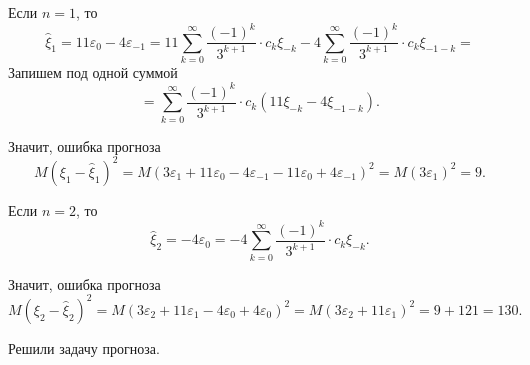 \begin{enumerate}[label=\alph*)]
  Если $n = 1$, то
  \begin{equation*}
    \hat{ \xi }_1 =
    11 \varepsilon_0 - 4 \varepsilon_{-1} =
    11 \sum \limits_{k = 0}^{ \infty } \frac{ \left( -1 \right)^k}{3^{k + 1}} \cdot c_k \xi_{-k} -
    4 \sum \limits_{k = 0}^{ \infty }
      \frac{ \left( -1 \right)^k}{3^{k + 1}} \cdot c_k \xi_{-1 - k} =
  \end{equation*}
  Запишем под одной суммой
  \begin{equation*}
    = \sum \limits_{k = 0}^{ \infty } \frac{ \left( -1 \right)^k}{3^{k + 1}} \cdot c_k
    \left( 11 \xi_{-k} - 4 \xi_{-1 - k} \right).
  \end{equation*}

  Значит, ошибка прогноза
  \begin{equation*}
    M \left( \xi_1 - \hat{ \xi }_1 \right)^2 =
    M \left(
      3 \varepsilon_1 + 11 \varepsilon_0 - 4 \varepsilon_{-1} - 11 \varepsilon_0 +
      4 \varepsilon_{-1}
    \right)^2 =
    M \left( 3 \varepsilon_1 \right)^2 =
    9.
  \end{equation*}

  Если $n = 2$, то
  \begin{equation*}
    \hat{ \xi }_2 =
    -4 \varepsilon_0 =
    -4 \sum \limits_{k = 0}^{ \infty } \frac{ \left( -1 \right)^k}{3^{k + 1}} \cdot c_k \xi_{-k}.
  \end{equation*}

  Значит, ошибка прогноза
  \begin{equation*}
    M \left( \xi_2 - \hat{ \xi }_2 \right)^2 =
    M \left( 3 \varepsilon_2 + 11 \varepsilon_1 - 4 \varepsilon_0 + 4 \varepsilon_0 \right)^2 =
    M \left( 3 \varepsilon_2 + 11 \varepsilon_1 \right)^2 =
    9 + 121 =
    130.
  \end{equation*}
\end{enumerate}
Решили задачу прогноза.
